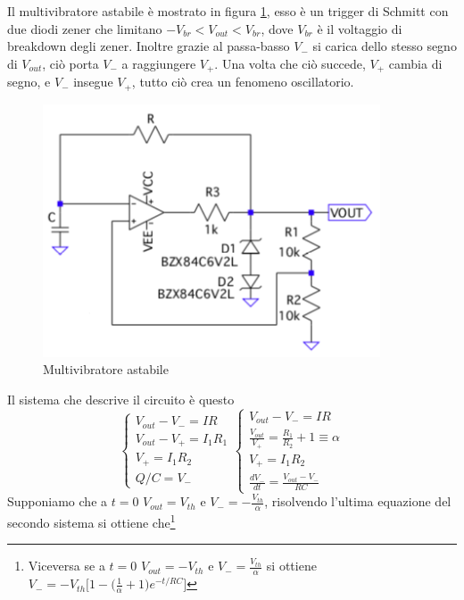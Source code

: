 \documentclass{article}
\begin{document}
		Il multivibratore astabile è mostrato in figura \ref{fig:multivibratore}, esso è un trigger di Schmitt con due diodi zener che limitano $-V_{br}<V_{out}<V_{br}$, dove $V_{br}$ è il voltaggio di breakdown degli zener. Inoltre grazie al passa-basso $V_-$ si carica dello stesso segno di $V_{out}$, ciò porta $V_-$ a raggiungere $V_+$.\newline
		Una volta che ciò succede, $V_+$ cambia di segno, e $V_-$ insegue $V_+$, tutto ciò crea un fenomeno oscillatorio.\newline
		\begin{figure}
			\centering
			\includegraphics[width=100mm]{immagini/multivibratore.png}
			\caption{Multivibratore astabile}
			\label{fig:multivibratore}
		\end{figure}
		Il sistema che descrive il circuito è questo
		\begin{equation}
			\begin{cases}
				V_{out}-V_-=IR\\
				V_{out}-V_+=I_1R_1\\
				V_+=I_1R_2\\
				Q/C=V_-
			\end{cases}
			\begin{cases}
				V_{out}-V_-=IR\\
				\frac{V_{out}}{V_+}=\frac{R_1}{R_2}+1\equiv \alpha\\
				V_+=I_1R_2\\
				\frac{dV_-}{dt}=\frac{V_{out}-V_-}{RC}
			\end{cases}
		\end{equation}
		Supponiamo che a $t=0$ $V_{out}=V_{th}$ e $V_-=-\frac{V_{th}}{\alpha}$, risolvendo l'ultima equazione del secondo sistema si ottiene che\footnote{Viceversa se a $t=0$ $V_{out}=-V_{th}$ e $V_-=\frac{V_{th}}{\alpha}$ si ottiene $V_-=-V_{th}\bigg[1-\bigg(\frac{1}{\alpha}+1\bigg)e^{-t/RC}\bigg]$}
\end{document}
